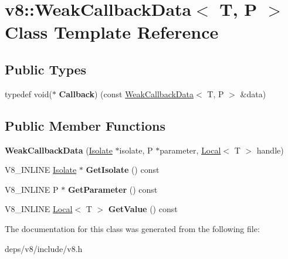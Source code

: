 \hypertarget{classv8_1_1_weak_callback_data}{}\section{v8\+:\+:Weak\+Callback\+Data$<$ T, P $>$ Class Template Reference}
\label{classv8_1_1_weak_callback_data}
\subsection*{Public Types}
\begin{DoxyCompactItemize}
\item 
\hypertarget{classv8_1_1_weak_callback_data_a08a29122f54c663fc2442d8f42c08ac2}{}typedef void($\ast$ {\bfseries Callback}) (const \hyperlink{classv8_1_1_weak_callback_data}{Weak\+Callback\+Data}$<$ T, P $>$ \&data)\label{classv8_1_1_weak_callback_data_a08a29122f54c663fc2442d8f42c08ac2}

\end{DoxyCompactItemize}
\subsection*{Public Member Functions}
\begin{DoxyCompactItemize}
\item 
\hypertarget{classv8_1_1_weak_callback_data_a804314135aa731fcab6d57aafddd26d3}{}{\bfseries Weak\+Callback\+Data} (\hyperlink{classv8_1_1_isolate}{Isolate} $\ast$isolate, P $\ast$parameter, \hyperlink{classv8_1_1_local}{Local}$<$ T $>$ handle)\label{classv8_1_1_weak_callback_data_a804314135aa731fcab6d57aafddd26d3}

\item 
\hypertarget{classv8_1_1_weak_callback_data_a499a971756182b5b52c28e506339c6b9}{}V8\+\_\+\+I\+N\+L\+I\+N\+E \hyperlink{classv8_1_1_isolate}{Isolate} $\ast$ {\bfseries Get\+Isolate} () const \label{classv8_1_1_weak_callback_data_a499a971756182b5b52c28e506339c6b9}

\item 
\hypertarget{classv8_1_1_weak_callback_data_a96ce7e1fbbfd56d0709225623517ff17}{}V8\+\_\+\+I\+N\+L\+I\+N\+E P $\ast$ {\bfseries Get\+Parameter} () const \label{classv8_1_1_weak_callback_data_a96ce7e1fbbfd56d0709225623517ff17}

\item 
\hypertarget{classv8_1_1_weak_callback_data_a0e8fcf0091132c96d548ac319284710a}{}V8\+\_\+\+I\+N\+L\+I\+N\+E \hyperlink{classv8_1_1_local}{Local}$<$ T $>$ {\bfseries Get\+Value} () const \label{classv8_1_1_weak_callback_data_a0e8fcf0091132c96d548ac319284710a}

\end{DoxyCompactItemize}


The documentation for this class was generated from the following file\+:\begin{DoxyCompactItemize}
\item 
deps/v8/include/v8.\+h\end{DoxyCompactItemize}

